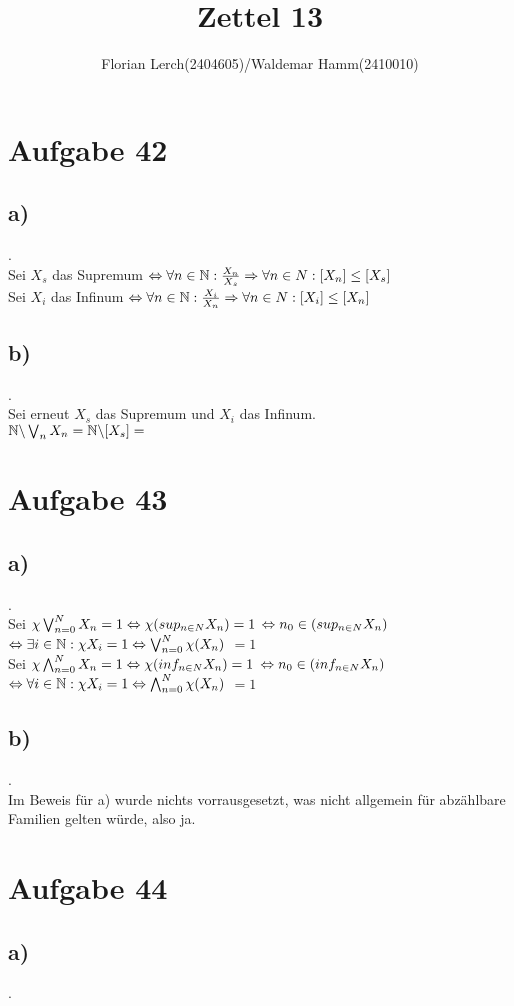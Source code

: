 \documentclass[11pt]{amsart}
\title{Zettel 13 }
\author{Florian Lerch(2404605)/Waldemar Hamm(2410010)}
\begin{document}
\maketitle

\section*{Aufgabe 42}
\subsection*{a)}.\\
Sei $X_s$ das Supremum $\Leftrightarrow \forall n \in \mathbb{N}: \frac{X_n}{X_s} \Rightarrow \forall n \in N: [X_n] \leq [X_s]$ \\
Sei $X_i$ das Infinum $\Leftrightarrow \forall n \in \mathbb{N}: \frac{X_i}{X_n} \Rightarrow \forall n \in N: [X_i] \leq [X_n]$ \\
\subsection*{b)}.\\
Sei erneut $X_s$ das Supremum und $X_i$ das Infinum. \\
$\mathbb{N} \backslash \bigvee_nX_n = \mathbb{N} \backslash [X_s] = $ %

\section*{Aufgabe 43}
\subsection*{a)}.\\ %
Sei $\chi \bigvee_{n=0}^{N}X_n = 1  \Leftrightarrow \chi(sup_{n\in N}X_n) = 1$ $\Leftrightarrow n_0 \in (sup_{n\in N}X_n)$ $\Leftrightarrow \exists i \in \mathbb{N}: \chi{X_i} = 1 \Leftrightarrow \bigvee^{N}_{n=0}\chi(X_n)$ $=1$ \\
Sei $\chi \bigwedge_{n=0}^{N}X_n = 1  \Leftrightarrow \chi(inf_{n\in N}X_n) = 1$ $\Leftrightarrow n_0 \in (inf_{n\in N}X_n)$ $\Leftrightarrow \forall i \in \mathbb{N}: \chi{X_i} = 1 \Leftrightarrow \bigwedge^{N}_{n=0}\chi(X_n)$ $=1$ \\
\subsection*{b)}.\\ %
Im Beweis für a) wurde nichts vorrausgesetzt, was nicht allgemein für abzählbare Familien gelten würde, also ja.

\section*{Aufgabe 44}
\subsection*{a)}.\\
\end{document}
